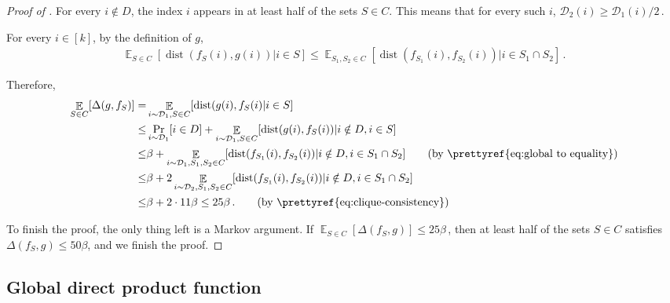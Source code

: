 \documentclass[11pt]{article}
\numberwithin{equation}{section}
\theoremstyle{definition}
\theoremstyle{plain}
\DeclareMathOperator*{\E}{\mathbb{E}} %
\newcommand{\Ex}[2][]{\E_{{#1}}\Brac{#2}} %
\newcommand{\Brac}[1]{\left[#1\right]} %
\newcommand\f{f} %
\newcommand\setf{f} %
\newcommand\pf{g} %
\DeclareMathOperator{\dist}{dist} %
\newcommand{\diff}{\Delta} %
\begin{document}
\begin{proof}[Proof of ]
	For every $i\notin D$, the index $i$ appears in at least half of the sets $S\in C$. This means that for every such $i$, $\mathcal{D}_2(i)\geq 
	\mathcal{D}_1(i)/2$\,. %
	
	For every $i\in[k]$, by the definition of $\pf$,
	\begin{align}\label{eq:global to equality}
	\E_{S\in C}[\dist(\setf_S(i),\pf(i))|i\in S] \leq
	\E_{S_1,S_2\in C}[\dist(\setf_{S_1}(i),\setf_{S_2}(i))|i\in S_1\cap S_2]\,. %
	\end{align}
	
	
	Therefore,
	\begin{align*}
	 \E_{S\in C}[\Delta(\pf,\f_S)] =&   \E_{i\sim\mathcal{D}_1,S\in C}[\dist(\pf(i),\f_S(i)|i\in S] \\
	 \leq& \Pr_{i\sim\mathcal{D}_1}[i\in D] + \E_{i\sim\mathcal{D}_1,S\in C}[\dist(\pf(i),\f_S(i))| i\notin D,i\in S]\\
	 \leq& \beta + \E_{i\sim\mathcal{D}_1,S_1,S_2\in C}[\dist(\f_{S_1}(i),\f_{S_2}(i))| i\notin D,i\in S_1\cap S_2] \tag{by \prettyref{eq:global to equality}}\\
	 \leq& \beta + 2\E_{i\sim\mathcal{D}_2,S_1,S_2\in C}[\dist(\f_{S_1}(i),\f_{S_2}(i))| i\notin D,i\in S_1\cap S_2] \\
	 \leq& \beta+ 2\cdot11\beta \leq 25\beta\,. 
	 \tag{\text{by \prettyref{eq:clique-consistency}}} %
	\end{align*}
	
	To finish the proof, the only thing left is a Markov argument. If $\Ex[S\in C]{\diff(\setf_S,\pf)} \leq 25\beta$\,, then at least half of the sets $S\in C$ satisfies $\diff(\setf_S,\pf) \leq 50\beta$, and we finish the proof.
\end{proof}



\subsection{Global direct product function} \label{sec:inputs}
\end{document}
